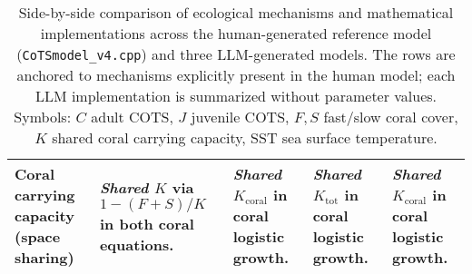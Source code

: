 \begin{landscape}
\begin{table}[htbp]
\begin{tabularx}{\linewidth}{@{}lXXXX@{}}
\midrule
\textbf{Coral carrying capacity (space sharing)} &
\textit{Shared \(K\)} via \(1 - (F+S)/K\) in both coral equations. &
\textit{Shared \(K_{\text{coral}}\)} in coral logistic growth. &
\textit{Shared \(K_{\text{tot}}\)} in coral logistic growth. &
\textit{Shared \(K_{\text{coral}}\)} in coral logistic growth. \\
\bottomrule
\end{tabularx}
\caption{Side-by-side comparison of ecological mechanisms and mathematical implementations across the human-generated reference model (\texttt{CoTSmodel\_v4.cpp}) and three LLM-generated models. The rows are anchored to mechanisms explicitly present in the human model; each LLM implementation is summarized without parameter values. Symbols: \(C\) adult COTS, \(J\) juvenile COTS, \(F,S\) fast/slow coral cover, \(K\) shared coral carrying capacity, \(\text{SST}\) sea surface temperature.}
\label{tab:mechanism_comparison}
\end{table}
\end{landscape}


